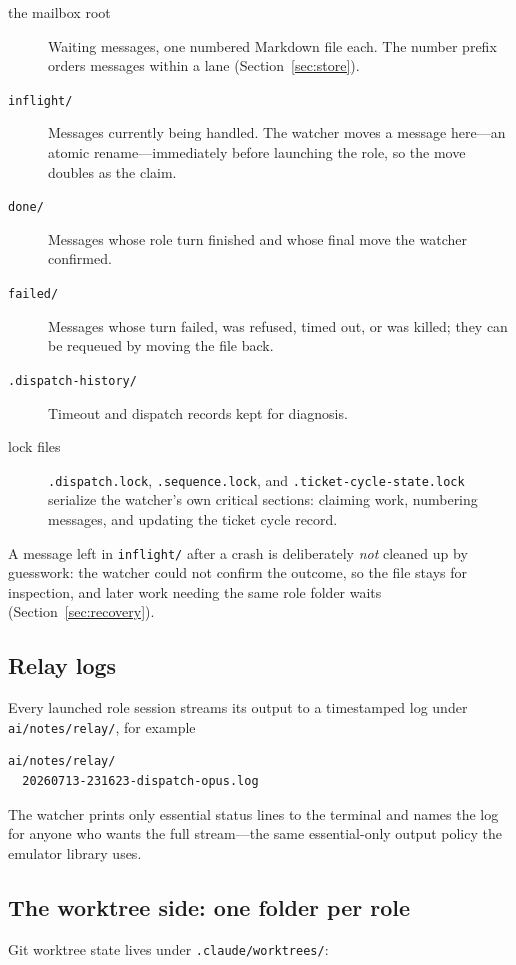\documentclass[10pt,aps,prd,twocolumn,nofootinbib]{revtex4-2}
\newcommand{\file}[1]{\texttt{#1}}
\begin{document}
\begin{description}
  \item[the mailbox root]  Waiting messages, one numbered Markdown file
  each.  The number prefix orders messages within a lane
  (Section~\ref{sec:store}).
  \item[\file{inflight/}]  Messages currently being handled.  The
  watcher moves a message here---an atomic rename---immediately before
  launching the role, so the move doubles as the claim.
  \item[\file{done/}]  Messages whose role turn finished and whose
  final move the watcher confirmed.
  \item[\file{failed/}]  Messages whose turn failed, was refused, timed
  out, or was killed; they can be requeued by moving the file back.
  \item[\file{.dispatch-history/}]  Timeout and dispatch records kept
  for diagnosis.
  \item[lock files]  \file{.dispatch.lock}, \file{.sequence.lock}, and
  \file{.ticket-cycle-state.lock} serialize the watcher's own critical
  sections: claiming work, numbering messages, and updating the ticket
  cycle record.
\end{description}

A message left in \file{inflight/} after a crash is deliberately
\emph{not} cleaned up by guesswork: the watcher could not confirm the
outcome, so the file stays for inspection, and later work needing the
same role folder waits (Section~\ref{sec:recovery}).

\subsection{Relay logs}

Every launched role session streams its output to a timestamped log
under \file{ai/notes/relay/}, for example
\begin{verbatim}
ai/notes/relay/
  20260713-231623-dispatch-opus.log
\end{verbatim}
The watcher prints only essential status lines to the terminal and
names the log for anyone who wants the full stream---the same
essential-only output policy the emulator library uses.

\subsection{The worktree side: one folder per role}

Git worktree state lives under \file{.claude/worktrees/}:
\end{document}
